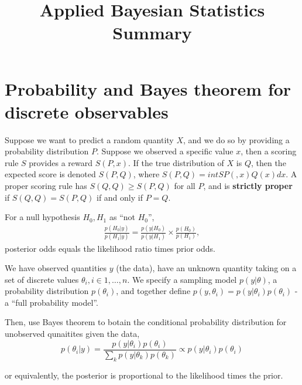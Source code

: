 

\title{Applied Bayesian Statistics Summary}



\maketitle

\section{Probability and Bayes theorem for discrete observables}
\label{sec:prob-bayes-theorobservables}

\begin{defn}
  \label{sec:prob-bayes-theor-1}
  Suppose we want to predict a random quantity $X$, and we do so by
  providing a probability distribution $P$.  Suppose we observed a
  specific value $x$, then a scoring rule $S$ provides a reward $S(P,
  x)$.  If the true distribution of $X$ is $Q$, then the expected
  score is denoted $S(P, Q)$, where $S(P, Q) = int SP(, x) Q(x) dx$.
  A proper scoring rule has $S(Q, Q) \geq S(P, Q)$ for all $P$, and is
  \textbf{strictly proper} if $S(Q, Q) = S(P, Q)$ if and only if $P = Q.$
\end{defn}

\begin{thm}
  \label{sec:prob-bayes-theor-2}
  For a null hypothesis $H_{0}, H_{1}$ as ``not $H_{0}$'',
  \begin{align}
    \label{eq:1}
    \frac{p(H_{0} | y)}{p(H_{1} | y)}  = \frac{p(y | H_{0})}{p(y |
      H_{1})} \times \frac{p(H_{0})}{p(H_{1})},
  \end{align}
  posterior odds equals the likelihood ratio times prior odds.
\end{thm}

\begin{defn}
  \label{sec:prob-bayes-theor-3}
  We have observed quantities $y$ (the data), have an unknown
  quantity taking on a set of discrete values $\theta_{i}, i \in 1,
  \dots, n$.  We specify a sampling model $p(y | \theta)$, a
  probability distribution $p(\theta_{i})$, and together define $p(y,
  \theta_{i}) = p(y | \theta_{i}) p(\theta_{i})$ - a ``full
  probability model''.

  Then, use Bayes theorem to botain the conditional probability
  distribution for unobserved qunaitites given the data,
  \begin{equation}
    \label{eq:2}
    p(\theta_{i} | y) = \frac{p(y | \theta_{i})
      p(\theta_{i})}{\sum_{k}^{} p(y | \theta_{k}) p(\theta_{k})}
    \propto p(y | \theta_{i}) p(\theta_{i})
  \end{equation}

  or equivalently, the posterior is proportional to the likelihood
  times the prior.
\end{defn}

